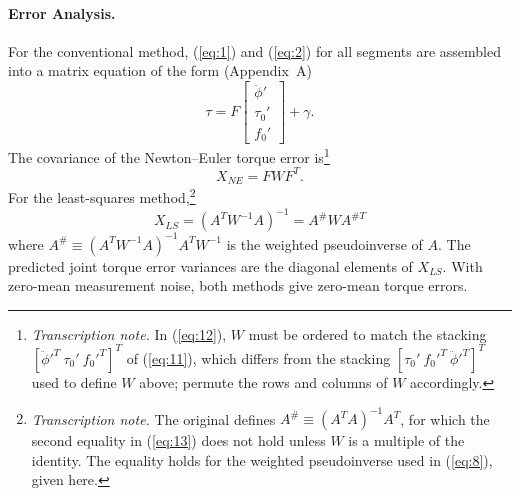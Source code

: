 \documentclass[11pt]{article}
\newcommand{\tnote}[1]{\footnote{\textit{Transcription note.} #1}}
\begin{document}
\paragraph{Error Analysis.} For the conventional method, (\ref{eq:1}) and
(\ref{eq:2}) for all segments are assembled into a matrix equation of the
form (Appendix~A)
\begin{equation}
\tau = F\begin{bmatrix}\ddot{\phi}'\\ \tau_0'\\ f_0'\end{bmatrix}
+ \gamma.
\label{eq:11}
\end{equation}
The covariance of the Newton--Euler torque error is\tnote{In (\ref{eq:12}),
$W$ must be ordered to match the stacking
$[\ddot{\phi}'^T\ \tau_0'\ f_0'^T]^T$ of (\ref{eq:11}), which differs from
the stacking $[\tau_0'\ f_0'^T\ \ddot{\phi}'^T]^T$ used to define $W$ above;
permute the rows and columns of $W$ accordingly.}
\begin{equation}
X_{NE} = F W F^T.
\label{eq:12}
\end{equation}
For the least-squares method,\tnote{The original defines
$A^{\#}\equiv(A^TA)^{-1}A^T$, for which the second equality in
(\ref{eq:13}) does not hold unless $W$ is a multiple of the identity. The
equality holds for the weighted pseudoinverse used in (\ref{eq:8}), given
here.}
\begin{equation}
X_{LS} = (A^TW^{-1}A)^{-1} = A^{\#}WA^{\#T}
\label{eq:13}
\end{equation}
where $A^{\#}\equiv(A^TW^{-1}A)^{-1}A^TW^{-1}$ is the weighted pseudoinverse
of $A$. The predicted joint torque error variances are the diagonal elements
of $X_{LS}$. With zero-mean measurement noise, both methods give zero-mean
torque errors.
\end{document}
